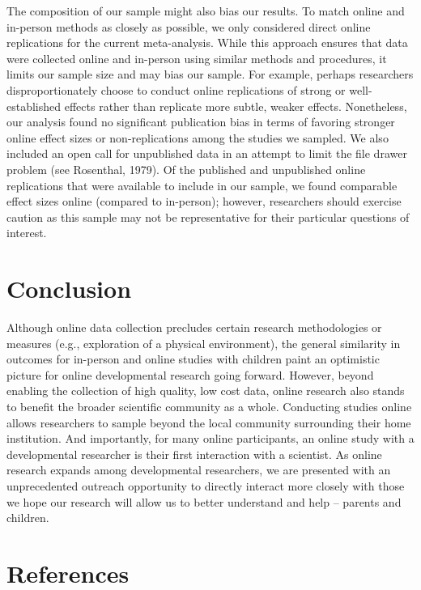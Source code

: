 \documentclass[
  man,floatsintext]{apa6}
\begin{document}
The composition of our sample might also bias our results. To match online and in-person methods as closely as possible, we only considered direct online replications for the current meta-analysis. While this approach ensures that data were collected online and in-person using similar methods and procedures, it limits our sample size and may bias our sample. For example, perhaps researchers disproportionately choose to conduct online replications of strong or well-established effects rather than replicate more subtle, weaker effects. Nonetheless, our analysis found no significant publication bias in terms of favoring stronger online effect sizes or non-replications among the studies we sampled. We also included an open call for unpublished data in an attempt to limit the file drawer problem (see Rosenthal, 1979). Of the published and unpublished online replications that were available to include in our sample, we found comparable effect sizes online (compared to in-person); however, researchers should exercise caution as this sample may not be representative for their particular questions of interest.

\hypertarget{conclusion}{%
\section{Conclusion}\label{conclusion}}

Although online data collection precludes certain research methodologies or measures (e.g., exploration of a physical environment), the general similarity in outcomes for in-person and online studies with children paint an optimistic picture for online developmental research going forward. However, beyond enabling the collection of high quality, low cost data, online research also stands to benefit the broader scientific community as a whole. Conducting studies online allows researchers to sample beyond the local community surrounding their home institution. And importantly, for many online participants, an online study with a developmental researcher is their first interaction with a scientist. As online research expands among developmental researchers, we are presented with an unprecedented outreach opportunity to directly interact more closely with those we hope our research will allow us to better understand and help -- parents and children.

\newpage

\hypertarget{references}{%
\section{References}\label{references}}
\end{document}
